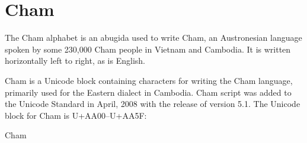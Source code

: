 \section{Cham}
\label{s:cham}

The Cham alphabet is an abugida used to write Cham, an Austronesian language spoken by some 230,000 Cham people in Vietnam and Cambodia. It is written horizontally left to right, as is English.

\newfontfamily{}

Cham is a Unicode block containing characters for writing the Cham language, primarily used for the Eastern dialect in Cambodia.
Cham script was added to the Unicode Standard in April, 2008 with the release of version 5.1.
The Unicode block for Cham is U+AA00–U+AA5F:

\begin{scriptexample}[]{Cham}
\end{scriptexample}


